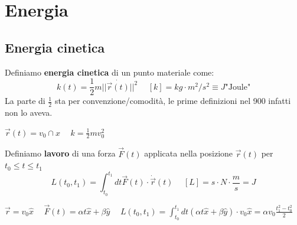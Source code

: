 \newpage
\section{Energia}
\subsection{Energia cinetica}
Definiamo \textbf{energia cinetica} di un punto materiale come:
$$k(t) = \frac{1}{2}m||\dot{\vec{r}(t)}||^2 \hspace{15pt} [k] = kg \cdot m^2/s^2 \equiv J \text{"Joule"}$$
La parte di $\frac{1}{2}$ sta per convenzione/comodità, le prime definizioni nel 900 infatti non lo aveva.
\begin{example}
    $\vec{r}(t) = v_0 \cap{x} \hspace{15pt} k= \frac{1}{2}mv_0^2$
\end{example}
Definiamo \textbf{lavoro} di una forza $\vec{F}(t)$ applicata nella posizione $\vec{r}(t)$ per $t_0 \leq t \leq t_1$
$$L(t_0, t_1) = \int_{t_0}^{t_1}dt \vec{F}(t) \cdot \dot{\vec{r}}(t) \hspace{15pt} [L] = s \cdot N \cdot \frac{m}{s} = J$$
\begin{example}
    $\vec{r} = v_0 \hat{x} \hspace{15pt} \vec{F}(t) = \alpha t \hat{x} + \beta \hat{y} \hspace{15pt} L(t_0, t_1) = \int_{t_0}^{t_1} dt(\alpha t\hat{x} + \beta \hat{y}) \cdot v_0 \hat{x} = \alpha v_0 \frac{t_1^2 - t_0^2}{2}$
\end{example}

